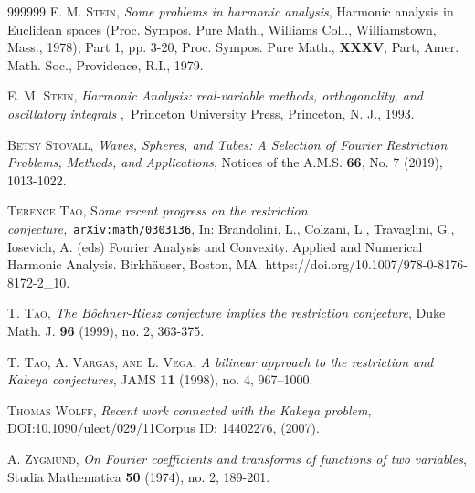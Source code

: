 \documentclass{amsart}%
\theoremstyle{plain}
\numberwithin{equation}{section}
\begin{document}
\begin{thebibliography}{999999}
\textsc{E. M. Stein,} \textit{Some problems in harmonic
analysis}, Harmonic analysis in Euclidean spaces (Proc. Sympos. Pure Math.,
Williams Coll., Williamstown, Mass., 1978), Part 1, pp. 3-20, Proc. Sympos.
Pure Math., \textbf{XXXV}, Part, Amer. Math. Soc., Providence, R.I., 1979.

\textsc{E. M. Stein,} \textit{Harmonic Analysis:
real-variable methods, orthogonality, and oscillatory integrals}%
,\textit{\ }Princeton University Press, Princeton, N. J., 1993.

\textsc{Betsy Stovall,} \textit{Waves, Spheres, and Tubes: A
Selection of Fourier Restriction Problems, Methods, and Applications}, Notices
of the A.M.S. \textbf{66}, No. 7 (2019), 1013-1022.

\textsc{Terence Tao, }S\textit{ome recent progress on the
restriction conjecture,}\ \texttt{arXiv:math/0303136}, In: Brandolini, L.,
Colzani, L., Travaglini, G., Iosevich, A. (eds) Fourier Analysis and
Convexity. Applied and Numerical Harmonic Analysis. Birkh\"{a}user, Boston,
MA. https://doi.org/10.1007/978-0-8176-8172-2\_10.

\textsc{T. Tao}, \textit{The B\^{o}chner-Riesz conjecture
implies the restriction conjecture}, Duke Math. J. \textbf{96} (1999), no. 2, 363-375.

\textsc{T. Tao, A. Vargas, and L. Vega}, \textit{A
bilinear approach to the restriction and Kakeya conjectures}, JAMS \textbf{11}
(1998), no. 4, 967--1000.

\textsc{Thomas Wolff, }\textit{Recent work connected with
the Kakeya problem}, DOI:10.1090/ulect/029/11Corpus ID: 14402276, (2007).

\textsc{A. Zygmund,} \textit{On Fourier coefficients and
transforms of functions of two variables}, Studia Mathematica \textbf{50}
(1974), no. 2, 189-201.
\end{thebibliography}
\end{document}

